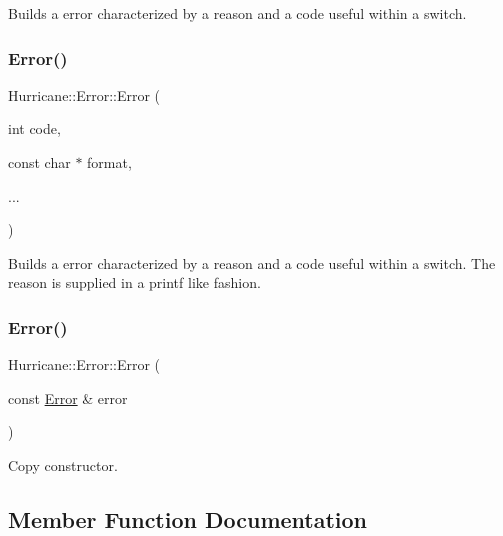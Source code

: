 Builds a error characterized by a reason and a code useful within a switch. \mbox{\label{classHurricane_1_1Error_a32ccc14fe29d7d2a7b5fe66ee0a3845c}} 
\subsubsection{\texorpdfstring{Error()}{Error()}\hspace{0.1cm}{\footnotesize\ttfamily [4/5]}}
{\footnotesize\ttfamily Hurricane\+::\+Error\+::\+Error (\begin{DoxyParamCaption}\item[{int}]{code,  }\item[{const char $\ast$}]{format,  }\item[{}]{... }\end{DoxyParamCaption})}

Builds a error characterized by a reason and a code useful within a switch. The reason is supplied in a {\ttfamily printf} like fashion. \mbox{\label{classHurricane_1_1Error_a7d90d5f5727dab2a9cc0a6427fb2b084}} 
\subsubsection{\texorpdfstring{Error()}{Error()}\hspace{0.1cm}{\footnotesize\ttfamily [5/5]}}
{\footnotesize\ttfamily Hurricane\+::\+Error\+::\+Error (\begin{DoxyParamCaption}\item[{const \mbox{\hyperlink{classHurricane_1_1Error}{Error}} \&}]{error }\end{DoxyParamCaption})}

Copy constructor. 

\subsection{Member Function Documentation}
\mbox{\label{classHurricane_1_1Error_a1a18927a2d4eb2b0b0acfc2908be7008}} 

